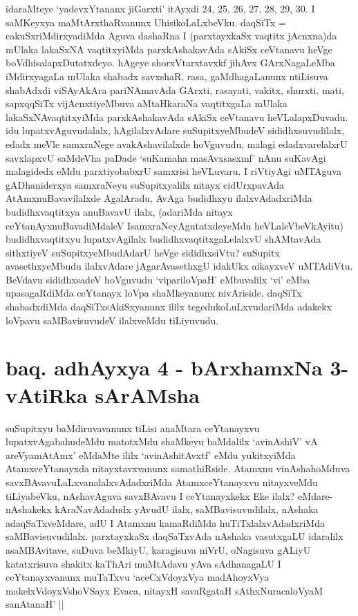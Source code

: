 \begin{artha}
idaraMteye `yadevxYtananx jiGarxti' itAyxdi 24, 25, 26, 27, 28, 29, 30. I saMKeyxya maMtArxthaRvanunx UhisikoLaLxbeVku. daqSiTx = cakuSxriMdirxyadiMda Aguva dashaRna I (parxtayxkaSx vaqtitx jAcnxna)da mUlaka lakaSxNA vaqtitxyiMda parxkAshakavAda sAkiSx ceVtanavu heVge boVdhisalapxDutatxdeyo. hAgeye shorxVtarxtavxkf jihAvx GArxNagaLeMba iMdirxyagaLa mUlaka shabadx savxshaR, rasa, gaMdhagaLanunx ntiLisuva shabAdxdi viSAyAkAra pariNAmavAda GArxti, rasayati, vakitx, shurxti, mati, sapxqqSiTx vijAcnxtiyeMbuva aMtaHkaraNa vaqtitxgaLa mUlaka lakaSxNAvaqtitxyiMda parxkAshakavAda sAkiSx ceVtanavu heVLalapxDuvadu. idu lupatxvAguvudalalx, hAgilalxvAdare suSupitxyeMbudeV sididhxsuvudilalx, edadx meVle samxraNege avakAshavilalxde hoVguvudu, malagi edadxvarelalxrU savxlapxvU saMdeVha paDade `suKamaha masAvxsasxmf' nAnu suKavAgi malagidedx eMdu parxtiyobabxrU samxrisi heVLuvaru. I riVtiyAgi uMTAguva gADhaniderxya samxraNeyu suSupitxyalilx nitayx cidUrxpavAda AtAmxnuBavavilalxde AgalAradu, AvAga budidhxyu ilalxvAdadxriMda budidhxvaqtitxya anuBavavU ilalx, (adariMda nitayx ceYtanAyxnuBavadiMdaleV IsamxraNeyAgutatxdeyeMdu heVLaleVbeVkAyitu) budidhxvaqtitxyu lupatxvAgilalx budidhxvaqtitxgaLelalxvU shAMtavAda sithxtiyeV suSupitxyeMbudAdarU heVge sididhxsiVtu? suSupitx avasethxyeMbudu ilalxvAdare jAgarAvasethxgU idakUkx aikayxveV uMTAdiVtu. BeVdavu sididhxsadeV hoVguvudu `vipariloVpaH' eMbuvalilx `vi' eMba upasagaRdiMda ceYtanayx loVpa shaMkeyanunx nivAriside, daqSiTx shabadxdiMda daqSiTxsAkiSxyanunx ililx tegedukoLuLxvudariMda adakekx loVpavu saMBavisuvudeV ilalxveMdu tiLiyuvudu.
\end{artha}



\section*{baq. adhAyxya 4 - bArxhamxNa 3-vAtiRka sArAMsha}

\begin{artha}%
suSupitxyu baMdiruvavanunx tiLisi anaMtara ceYtanayxvu lupatxvAgabahudeMdu matotxMdu shaMkeyu baMdalilx `avinAshiV' vA areV\s yamAtAmx' eMdaMte ililx `avinAshitAvxtf' eMdu yukitxyiMda AtamxceYtanayxda nitayxtavxvanunx samathiRside. Atamxnu vinAshahoMduva savxBAvavuLaLxvanalalxvAdadxriMda AtamxceYtanayxvu nitayxveMdu tiLiyabeVku, nAshavAguva savxBAvavu I ceYtanayxkekx Eke ilalx? eMdare- nAshakekx kAraNavAdadudx yAvudU ilalx, saMBavisuvudilalx, nAshaka adaqSaTxveMdare, adU I Atamxnu kamaRdiMda huTiTxlalxvAdadxriMda saMBavisuvudilalx. parxtayxkaSx daqSaTxvAda nAshaka vasutxgaLU idaralilx asaMBAvitave, suDuva beMkiyU, karagisuva niVrU, oNagisuva gALiyU katatxrisuva shakitx kaThAri muMtAdavu yAva sAdhanagaLU I ceYtanayxvanunx muTaTxvu `aceCxVdoyxV\s ya madAhoyxV\s ya makelxVdoyxV\s shoVSayx Evaca, nitayxH savaRgataH sAthxNuracaloV\s yaM sanAtanaH' ||
\end{artha}

